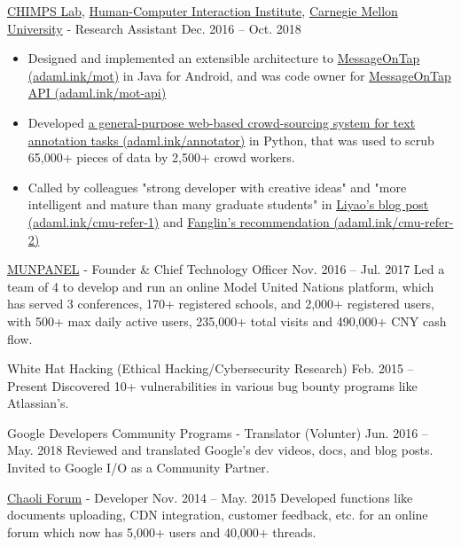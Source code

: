 \documentclass[hidelinks__VERSION__]{adamyi-cv}
\begin{document}
\begin{entrylist}


\entry
{\href{http://cmuchimps.org/}{CHIMPS Lab}, \href{https://www.hcii.cmu.edu/}{Human-Computer Interaction Institute}, \href{https://www.cmu.edu/}{Carnegie Mellon University} - Research Assistant}
{Dec. 2016 -- Oct. 2018}
{
\begin{minipage}[t]{1\linewidth}
\begin{itemize}[leftmargin=*,align=left,noitemsep]
\item Designed and implemented an extensible architecture to \href{https://adaml.ink/mot}{MessageOnTap (adaml.ink/mot)} in Java for Android, and was code owner for \href{https://adaml.ink/mot-api}{MessageOnTap API (adaml.ink/mot-api)}
\item Developed \href{https://adaml.ink/annotator}{a general-purpose web-based crowd-sourcing system for text annotation tasks (adaml.ink/annotator)} in Python, that was used to scrub 65,000+ pieces of data by 2,500+ crowd workers.
\item Called by colleagues "strong developer with creative ideas" and "more intelligent and mature than many graduate students" in \href{https://adaml.ink/cmu-refer-1}{Liyao's blog post (adaml.ink/cmu-refer-1)} and \href{https://adaml.ink/cmu-refer-2}{Fanglin's recommendation (adaml.ink/cmu-refer-2)}
\end{itemize}
\end{minipage}
}


\entry
{\href{https://www.munpanel.com}{MUNPANEL} - Founder \& Chief Technology Officer}
{Nov. 2016 -- Jul. 2017}
{Led a team of 4 to develop and run an online Model United Nations platform, which has served 3 conferences, 170+ registered schools, and 2,000+ registered users, with 500+ max daily active users, 235,000+ total visits and 490,000+ CNY cash flow.}


\entry
{White Hat Hacking (Ethical Hacking/Cybersecurity Research)}
{Feb. 2015 -- Present}
{Discovered 10+ vulnerabilities in various bug bounty programs like Atlassian's.}


\entry
{Google Developers Community Programs - Translator (Volunter)}
{Jun. 2016 -- May. 2018}
{Reviewed and translated Google's dev videos, docs, and blog posts. Invited to Google I/O as a Community Partner.}


\entry
{\href{https://chaoli.club}{Chaoli Forum} - Developer}
{Nov. 2014 -- May. 2015}
{Developed functions like documents uploading, CDN integration, customer feedback, etc. for an online forum which now has 5,000+ users and 40,000+ threads.}

\end{entrylist}
\end{document}
